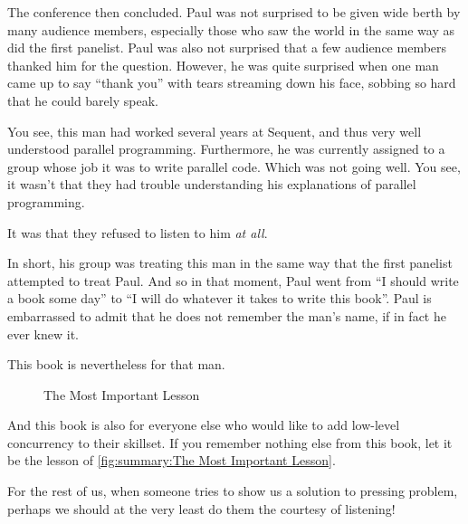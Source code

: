 The conference then concluded.
Paul was not surprised to be given wide berth by many audience members,
especially those who saw the world in the same way as did the first panelist.
Paul was also not surprised that a few audience members thanked him for
the question.
However, he was quite surprised when one man came up to say ``thank
you'' with tears streaming down his face, sobbing so hard that he could
barely speak.

You see, this man had worked several years at Sequent, and thus very
well understood parallel programming.
Furthermore, he was currently assigned to a group whose job it was to
write parallel code.
Which was not going well.
You see, it wasn't that they had trouble understanding his explanations
of parallel programming.

It was that they refused to listen to him \emph{at all}.

In short, his group was treating this man in the same way that the first
panelist attempted to treat Paul.
And so in that moment, Paul went from ``I should write a book some day''
to ``I will do whatever it takes to write this book''.
Paul is embarrassed to admit that he does not remember the man's name,
if in fact he ever knew it.

This book is nevertheless for that man.

\begin{figure}
\centering
{}
\caption{The Most Important Lesson}
\end{figure}

And this book is also for everyone else who would like to add low-level
concurrency to their skillset.
If you remember nothing else from this book, let it be the lesson of
\cref{fig:summary:The Most Important Lesson}.

For the rest of us, when someone tries to show us a solution to pressing
problem, perhaps we should at the very least do them the courtesy of
listening!
